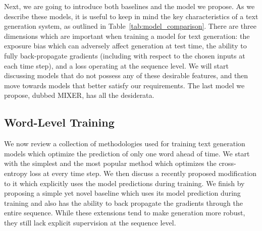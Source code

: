 Next, we are going to introduce both baselines and the model we propose. As we describe these models, it is useful to keep in mind the key characteristics of a text generation system, as outlined in Table~\ref{tab:model_comparison}. There are three dimensions which are important when training a model for text generation: the exposure bias which can adversely affect generation at test time, the ability to fully back-propagate gradients (including with respect to the chosen inputs at each time step), and a loss operating at the sequence level. 
 We will start discussing models that do not possess any of these desirable features, and then move towards models that better satisfy our requirements. The last model we propose, dubbed MIXER, has all the desiderata.

\subsection{Word-Level Training}
We now review a collection of methodologies used for training text generation models which 
optimize the prediction of only one word ahead of time. 
We start with the simplest and the most popular method which optimizes the cross-entropy 
loss at every time step. We then discuss a recently proposed modification to it 
which explicitly uses the model predictions during training. 
We finish by proposing a simple yet novel baseline which uses its model prediction during 
training and also has the ability to back propagate the gradients through the entire sequence. 
While these extensions tend to make generation more robust, 
they still lack explicit supervision at the sequence level. 

